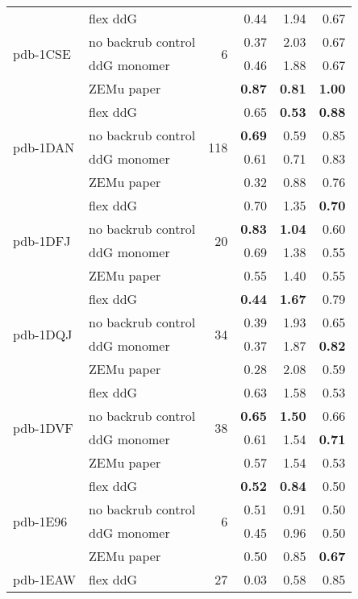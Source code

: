 {\begin{longtable}{llrrrr}
\hline
 \multirow{ 4}{*}{pdb-1CSE} & flex ddG & \multirow{ 4}{*}{6} & 0.44 & 1.94 & 0.67  \\
 & no backrub control & & 0.37 & 2.03 & 0.67  \\
 & ddG monomer & & 0.46 & 1.88 & 0.67  \\
 & ZEMu paper & & \textbf{0.87} & \textbf{0.81} & \textbf{1.00}  \\
\hline
 \multirow{ 4}{*}{pdb-1DAN} & flex ddG & \multirow{ 4}{*}{118} & 0.65 & \textbf{0.53} & \textbf{0.88}  \\
 & no backrub control & & \textbf{0.69} & 0.59 & 0.85  \\
 & ddG monomer & & 0.61 & 0.71 & 0.83  \\
 & ZEMu paper & & 0.32 & 0.88 & 0.76  \\
\hline
 \multirow{ 4}{*}{pdb-1DFJ} & flex ddG & \multirow{ 4}{*}{20} & 0.70 & 1.35 & \textbf{0.70}  \\
 & no backrub control & & \textbf{0.83} & \textbf{1.04} & 0.60  \\
 & ddG monomer & & 0.69 & 1.38 & 0.55  \\
 & ZEMu paper & & 0.55 & 1.40 & 0.55  \\
\hline
 \multirow{ 4}{*}{pdb-1DQJ} & flex ddG & \multirow{ 4}{*}{34} & \textbf{0.44} & \textbf{1.67} & 0.79  \\
 & no backrub control & & 0.39 & 1.93 & 0.65  \\
 & ddG monomer & & 0.37 & 1.87 & \textbf{0.82}  \\
 & ZEMu paper & & 0.28 & 2.08 & 0.59  \\
\hline
 \multirow{ 4}{*}{pdb-1DVF} & flex ddG & \multirow{ 4}{*}{38} & 0.63 & 1.58 & 0.53  \\
 & no backrub control & & \textbf{0.65} & \textbf{1.50} & 0.66  \\
 & ddG monomer & & 0.61 & 1.54 & \textbf{0.71}  \\
 & ZEMu paper & & 0.57 & 1.54 & 0.53  \\
\hline
 \multirow{ 4}{*}{pdb-1E96} & flex ddG & \multirow{ 4}{*}{6} & \textbf{0.52} & \textbf{0.84} & 0.50  \\
 & no backrub control & & 0.51 & 0.91 & 0.50  \\
 & ddG monomer & & 0.45 & 0.96 & 0.50  \\
 & ZEMu paper & & 0.50 & 0.85 & \textbf{0.67}  \\
\hline
 \multirow{ 4}{*}{pdb-1EAW} & flex ddG & \multirow{ 4}{*}{27} & 0.03 & 0.58 & 0.85  \\

\end{longtable}}
